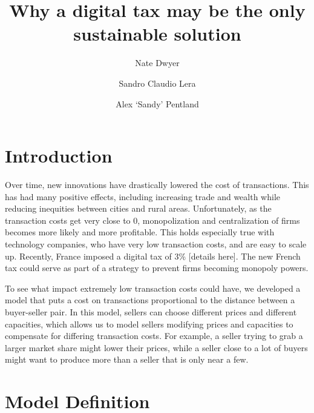 \documentclass[final,5p,times,twocolumn,11pt]{elsarticle}
\numberwithin{equation}{section} %
\begin{document}
\begin{frontmatter}

\title{Why a digital tax may be the only sustainable solution}

\author[add1]{Nate Dwyer}

\author[add1]{Sandro Claudio Lera}

\author[add1]{Alex `Sandy' Pentland}

\address[add1]{\scriptsize Massachusetts Institute of Technology, 77 Massachusetts Avenue, 02139 Cambridge, Massachusetts, USA}

\end{frontmatter}


\section{Introduction}
\label{sec:Introduction}
Over time, new innovations have drastically lowered the cost of transactions.
This has had many positive effects, including increasing trade and wealth while
reducing inequities between cities and rural areas. Unfortunately,
as the transaction costs get very close to 0, monopolization and centralization
of firms becomes more likely and more profitable. This holds especially true
with technology companies, who have very low transaction costs, and are easy to
scale up. Recently, France imposed a  digital tax of 3\% [details here]. The
new French tax could serve as part of a strategy to prevent firms becoming
monopoly powers.

To see what impact extremely low transaction costs could have, we developed a
model that puts a cost on transactions proportional to the distance between a
buyer-seller pair. In this model, sellers can choose different prices and
different capacities, which allows us to model sellers modifying prices and
capacities to compensate for differing transaction costs. For example, a seller
trying to grab a larger market share might lower their prices, while a seller
close to a lot of buyers might want to produce more than a seller that is only
near a few.

\section{Model Definition}
\end{document}
